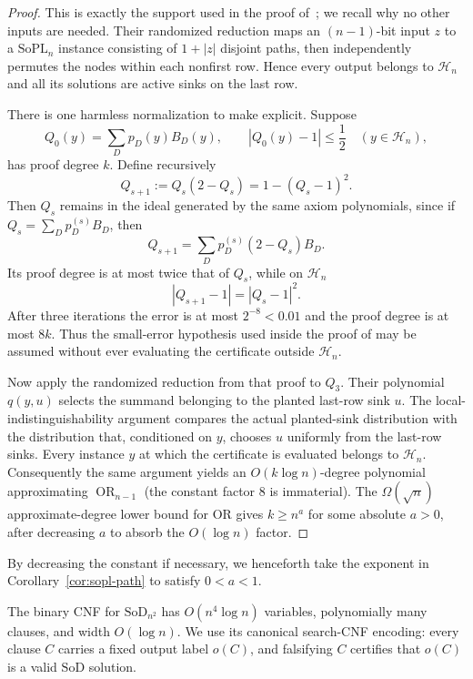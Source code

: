 \documentclass[11pt]{article}
\theoremstyle{definition}
\newcommand{\SoPL}{\mathrm{SoPL}}
\newcommand{\SoD}{\mathrm{SoD}}
\begin{document}
\begin{proof}
This is exactly the support used in the proof of~\cite[Lemma~1]{GHJMPRT}; we recall
why no other inputs are needed.  Their randomized reduction maps an
$(n-1)$-bit input $z$ to a $\SoPL_n$ instance consisting of $1+|z|$ disjoint paths,
then independently permutes the nodes within each nonfirst row.  Hence every output
belongs to $\mathcal H_n$ and all its solutions are active sinks on the last row.

There is one harmless normalization to make explicit.  Suppose
\[
  Q_0(y)=\sum_D p_D(y)B_D(y),\qquad
  |Q_0(y)-1|\le \frac12\quad(y\in\mathcal H_n),
\]
has proof degree $k$.  Define recursively
\[
  Q_{s+1}:=Q_s(2-Q_s)=1-(Q_s-1)^2.
\]
Then $Q_s$ remains in the ideal generated by the same axiom polynomials, since if
$Q_s=\sum_D p_D^{(s)}B_D$, then
\[
  Q_{s+1}=\sum_D p_D^{(s)}(2-Q_s)B_D.
\]
Its proof degree is at most twice that of $Q_s$, while on $\mathcal H_n$
\[
  |Q_{s+1}-1|=|Q_s-1|^2.
\]
After three iterations the error is at most $2^{-8}<0.01$ and the proof degree is at
most $8k$.  Thus the small-error hypothesis used inside the proof of
\cite[Lemma~1]{GHJMPRT} may be assumed without ever evaluating the certificate outside
$\mathcal H_n$.

Now apply the randomized reduction from that proof to $Q_3$.  Their polynomial
$q(y,u)$ selects the summand belonging to the planted last-row sink $u$.  The
local-indistinguishability argument compares the actual planted-sink distribution with
the distribution that, conditioned on $y$, chooses $u$ uniformly from the last-row
sinks.  Every instance $y$ at which the certificate is evaluated belongs to
$\mathcal H_n$.  Consequently the same argument yields an
$O(k\log n)$-degree polynomial approximating $\operatorname{OR}_{n-1}$ (the constant
factor $8$ is immaterial).  The $\Omega(\sqrt n)$ approximate-degree lower bound for
OR gives $k\ge n^a$ for some absolute $a>0$, after decreasing $a$ to absorb the
$O(\log n)$ factor.
\end{proof}

By decreasing the constant if necessary, we henceforth take the exponent in
Corollary~\ref{cor:sopl-path} to satisfy $0<a<1$.

The binary CNF for $\SoD_{n^2}$ has $O(n^4\log n)$ variables, polynomially many
clauses, and width $O(\log n)$.  We use its canonical search-CNF encoding: every
clause $C$ carries a fixed output label $o(C)$, and falsifying $C$ certifies that
$o(C)$ is a valid $\SoD$ solution.
\end{document}
